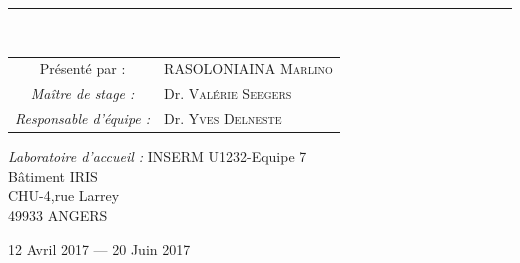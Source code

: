 \documentclass[a4paper,10pt]{article}
\newcommand\tabA[1][0.5cm]{\hspace*{#1}}
\newcommand\tabC[1][2cm]{\hspace*{#1}}
\newcommand{\HRule}{\rule{\linewidth}{0.5mm}}
\begin{document}
\begin{titlepage}
\begin{sffamily}
\begin{center}
    \HRule \\[2cm]
    \centering\vspace*{\fill}
    \begin{minipage}{9\textwidth}
    \begin{doublespace}
    \begin{tabular}{cl}
       \large Présenté par : &\tabC \tabA \textsc{RASOLONIAINA Marlino}\\
       \newline
       \emph{Maître de stage  :} &\tabC \tabA Dr. \textsc{Valérie Seegers}\\
       \emph{Responsable d'équipe : } &\tabC \tabA Dr.  \textsc{Yves Delneste} \\
       
    \end{tabular}
     \end{doublespace}
    \emph{Laboratoire d'accueil :} \tabC \tabA \textsc{INSERM U1232}-Equipe 7
    \\\tabC \tabC \tabC \tabA Bâtiment IRIS 
    \\\tabC \tabC \tabC \tabA CHU-4,rue Larrey 
    \\\tabC \tabC \tabC \tabA 49933 ANGERS
    \end{minipage}
    \vspace*{\fill}
%  

    {\large 12 Avril 2017 — 20 Juin 2017}

  \end{center}
  \end{sffamily}
\end{titlepage}
\newpage
\tableofcontents
\newpage
\listoffigures
\newpage
\listoftables
\newpage
{}
\end{document}
